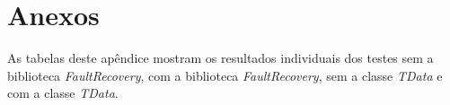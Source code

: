 
\chapter{Anexos} \label{App:ApendiceA}

As tabelas deste apêndice mostram os resultados individuais dos testes sem a biblioteca \textit{FaultRecovery}, com a biblioteca \textit{FaultRecovery}, sem a classe \textit{TData} e com a classe \textit{TData}.

%
